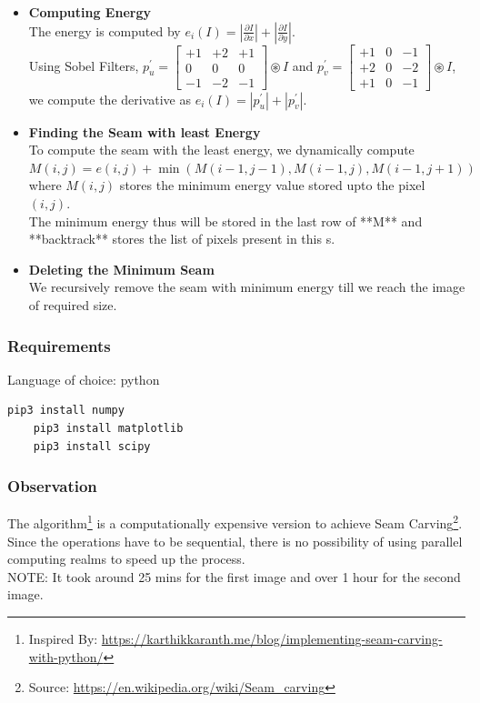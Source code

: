 \begin{itemize}

	\item \textbf{Computing Energy} \\
The energy is computed by $e_i(I)=\left|\frac{\partial I}{\partial x}\right| + \left|\frac{\partial I}{\partial y}\right|$. \\
Using Sobel Filters, 
$p^{\prime}_u = \begin{bmatrix} +1 & +2 & +1\\ 0 & 0 & 0 \\ -1 & -2 & -1 \end{bmatrix} \circledast I$ and 
$p^{\prime}_v = \begin{bmatrix} +1 & 0 & -1\\ +2 & 0 & -2 \\ +1 & 0 & -1 \end{bmatrix} \circledast I$, we compute the derivative as $e_i(I)=\left|p^{\prime}_u\right| + \left|p^{\prime}_v\right|$.

	\item \textbf{Finding the Seam with least Energy} \\
To compute the seam with the least energy, we dynamically compute $M\left(i,j\right)=e\left(i,j\right)+\min\left( M\left(i-1,j-1\right), M\left(i-1,j\right), M\left(i-1,j+1\right)\right)$ where $M\left(i,j\right)$ stores the minimum energy value stored upto the pixel $\left(i,j\right)$.\\
The minimum energy thus will be stored in the last row of **M** and **backtrack** stores the list of pixels present in this s.

	\item \textbf{Deleting the Minimum Seam} \\
We recursively remove the seam with minimum energy till we reach the image of required size.
\end{itemize}

\subsubsection{Requirements}
Language of choice: python
\begin{lstlisting}[language=bash]
	pip3 install numpy
	pip3 install matplotlib
	pip3 install scipy
\end{lstlisting}

\subsubsection{Observation}
The algorithm\footnote{Inspired By: \url{https://karthikkaranth.me/blog/implementing-seam-carving-with-python/}} is a computationally expensive version to achieve Seam Carving\footnote{Source: \url{https://en.wikipedia.org/wiki/Seam_carving}}. Since the operations have to be sequential, there is no possibility of using parallel computing realms to speed up the process.\\
NOTE: It took around 25 mins for the first image and over 1 hour for the second image.

